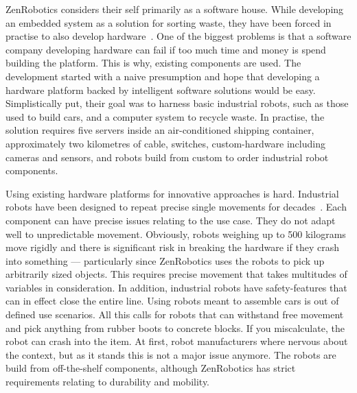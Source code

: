 \documentclass[english]{tktltiki2}
\begin{document}
ZenRobotics considers their self primarily as a software house. While developing an embedded system as a solution for sorting waste, they have been forced in practise to also develop hardware~\cite{Hol15a}. One of the biggest problems is that a software company developing hardware can fail if too much time and money is spend building the platform. This is why, existing components are used. The development started with a naive presumption and hope that developing a hardware platform backed by intelligent software solutions would be easy. Simplistically put, their goal was to harness basic industrial robots, such as those used to build cars, and a computer system to recycle waste. In practise, the solution requires five servers inside an air-conditioned shipping container, approximately two kilometres of cable, switches, custom-hardware including cameras and sensors, and robots build from custom to order industrial robot components.

Using existing hardware platforms for innovative approaches is hard. Industrial robots have been designed to repeat precise single movements for decades~\cite{Hol15a}. Each component can have precise issues relating to the use case. They do not adapt well to unpredictable movement. Obviously, robots weighing up to 500 kilograms move rigidly and there is significant risk in breaking the hardware if they crash into something — particularly since ZenRobotics uses the robots to pick up arbitrarily sized objects. This requires precise movement that takes multitudes of variables in consideration. In addition, industrial robots have safety-features that can in effect close the entire line. Using robots meant to assemble cars is out of defined use scenarios. All this calls for robots that can withstand free movement and pick anything from rubber boots to concrete blocks. If you miscalculate, the robot can crash into the item. At first, robot manufacturers where nervous about the context, but as it stands this is not a major issue anymore. The robots are build from off-the-shelf components, although ZenRobotics has strict requirements relating to durability and mobility.
\end{document}
